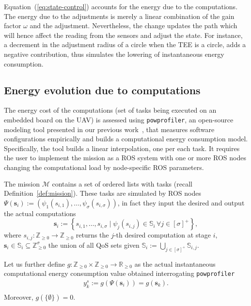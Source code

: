 \documentclass[letterpaper,10pt,conference]{ieeeconf}
\newcommand{\stt}[1]{{\small\tt #1}} %
\newcommand{\powprof}{\stt{powprofiler}}
\theoremstyle{definition}
\begin{document}
Equation~(\ref{eq:state-control}) accounts for the energy due to the computations. The energy due to the adjustments is merely a linear combination of the gain factor $\omega$ and the adjustment. Nevertheless, the change updates the path which will hence affect the reading from the sensors and adjust the state. For instance, a decrement in the adjustment radius of a circle when the TEE is a circle, adds a negative contribution, thus simulates the lowering of instantaneous energy consumption.

\subsection{Energy evolution due to computations}
\label{sec:computations-model}

The energy cost of the computations (set of tasks being executed on an embedded board on the UAV) is assessed using \powprof{}, an open-source modeling tool presented in our previous work~\cite{seewald2019coarse}, that measures software configurations empirically and builds a computational energy consumption model. Specifically, the tool builds a linear interpolation, one per each task. It requires the user to implement the mission as a ROS system with one or more ROS nodes changing the computational load by node-specific ROS parameters. 

The mission $\mathcal{M}$ contains a set of ordered lists with tasks (recall Definition~\ref{def:mission}). These tasks are simulated by ROS nodes $\Psi(\mathbf{s}_i):=\left(\psi_1(s_{i,1}),\dots,\psi_\sigma(s_{i,\sigma})\right)$, in fact they input the desired and output the actual computations
\begin{equation}\label{eq:qos-def}
  \mathbf{s}_i:=\left\{s_{i,1},\dots ,s_{i,\sigma}\mid \psi_j(s_{i,j})\in\mathbb{S}_{i}\,\forall j\in[\sigma]^+\right\},
\end{equation}
where $s_{i,j}:\mathbb{Z}_{\geq 0}\rightarrow\mathbb{Z}_{\geq 0}$ returns the $j$-th desired computation at stage $i$, $\mathbf{s}_i\in\mathbb{S}_i\subseteq\mathbb{Z}_{\geq 0}^\sigma$ the union of all QoS sets given $\mathbb{S}_i:=\bigcup_{j\in[\sigma]^+}{\mathbb{S}_{i,j}}$.

Let us further define $g:\mathbb{Z}_{\geq 0}\times\mathbb{Z}_{\geq 0}\rightarrow\mathbb{R}_{\geq 0}$ as the actual instantaneous computational energy consumption value obtained interrogating \powprof{}
\begin{equation}\label{eq:energy-comp}\begin{split}
  y_k^s:=g\left(\Psi(\mathbf{s}_i)\right)=g\left(\mathbf{s}_{k}\right).\\
\end{split}\end{equation}
Moreover, $g(\{\emptyset\})=0$.
\end{document}
